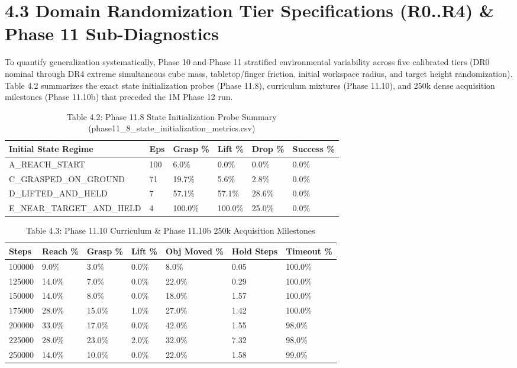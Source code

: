 \documentclass[11pt,a4paper,oneside]{book}
\begin{document}
\section{4.3 Domain Randomization Tier Specifications (R0..R4) \& Phase 11 Sub-Diagnostics}
To quantify generalization systematically, Phase 10 and Phase 11 stratified environmental variability across five calibrated tiers (DR0 nominal through DR4 extreme simultaneous cube mass, tabletop/finger friction, initial workspace radius, and target height randomization). Table 4.2 summarizes the exact state initialization probes (Phase 11.8), curriculum mixtures (Phase 11.10), and 250k dense acquisition milestones (Phase 11.10b) that preceded the 1M Phase 12 run.

\begin{longtable}{l l l l l l}\caption{Table 4.2: Phase 11.8 State Initialization Probe Summary (phase11\_8\_state\_initialization\_metrics.csv)}\\\toprule
Initial State Regime & Eps & Grasp \% & Lift \% & Drop \% & Success \% \\ \midrule \endhead
A\_REACH\_START & 100 & 6.0\% & 0.0\% & 0.0\% & 0.0\% \\
C\_GRASPED\_ON\_GROUND & 71 & 19.7\% & 5.6\% & 2.8\% & 0.0\% \\
D\_LIFTED\_AND\_HELD & 7 & 57.1\% & 57.1\% & 28.6\% & 0.0\% \\
E\_NEAR\_TARGET\_AND\_HELD & 4 & 100.0\% & 100.0\% & 25.0\% & 0.0\% \\
\bottomrule \end{longtable}
\begin{longtable}{l l l l l l l}\caption{Table 4.3: Phase 11.10 Curriculum \& Phase 11.10b 250k Acquisition Milestones}\\\toprule
Steps & Reach \% & Grasp \% & Lift \% & Obj Moved \% & Hold Steps & Timeout \% \\ \midrule \endhead
100000 & 9.0\% & 3.0\% & 0.0\% & 8.0\% & 0.05 & 100.0\% \\
125000 & 14.0\% & 7.0\% & 0.0\% & 22.0\% & 0.29 & 100.0\% \\
150000 & 14.0\% & 8.0\% & 0.0\% & 18.0\% & 1.57 & 100.0\% \\
175000 & 28.0\% & 15.0\% & 1.0\% & 27.0\% & 1.42 & 100.0\% \\
200000 & 33.0\% & 17.0\% & 0.0\% & 42.0\% & 1.55 & 98.0\% \\
225000 & 28.0\% & 23.0\% & 2.0\% & 32.0\% & 7.32 & 98.0\% \\
250000 & 14.0\% & 10.0\% & 0.0\% & 22.0\% & 1.58 & 99.0\% \\
\bottomrule \end{longtable}
\end{document}
